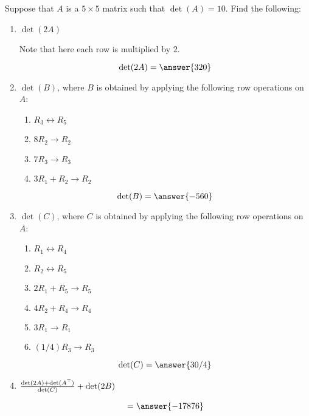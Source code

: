\documentclass{ximera}
\author{Parisa Fatheddin}
\begin{document}
\begin{exercise}
  Suppose that $A$ is a $5\times 5$ matrix such that $\det(A)=10$. Find the following:
  \begin{enumerate}
  \item $\det(2A)$
    \begin{prompt}
      \begin{hint}
        Note that here each row is multiplied by $2$.
      \end{hint}
      \[ \det(2A)= \answer{320}\]
    \end{prompt}
  \item $\det(B)$, where $B$ is obtained by applying the following row
    operations on $A$:
    \begin{enumerate}
      \item $R_{3} \leftrightarrow R_{5}$
      \item $8R_{2} \to R_2$
      \item $7 R_{3} \to R_3$
      \item $3R_{1}+ R_{2} \to R_{2}$
      \pdfOnly{\end{multicols}}
    \end{enumerate}
    \begin{prompt}
      \[\det(B)= \answer{-560}\]
    \end{prompt}
  \item $\det(C)$, where $C$ is obtained by applying the following row
    operations on $A$:
    \begin{enumerate}
      \item $R_{1}\leftrightarrow R_{4}$
      \item $R_{2} \leftrightarrow R_{5}$
      \item $2R_{1} + R_{5} \to R_{5}$
      \item $4R_{2} + R_{4} \to R_{4}$
      \item $3R_{1} \to R_1$
      \item $(1/4) R_{3} \to R_3$
      \pdfOnly{\end{multicols}}
    \end{enumerate}
    \begin{prompt}
      \[\det(C) = \answer{30/4}\]
    \end{prompt}
  \item $\frac{\det(2A) + \det (A^\top)}{\det(C)} + \det(2B)$
    \begin{prompt}
      \[ = \answer{-17876}\]
    \end{prompt}
  \end{enumerate}
\end{exercise}
\end{document}
